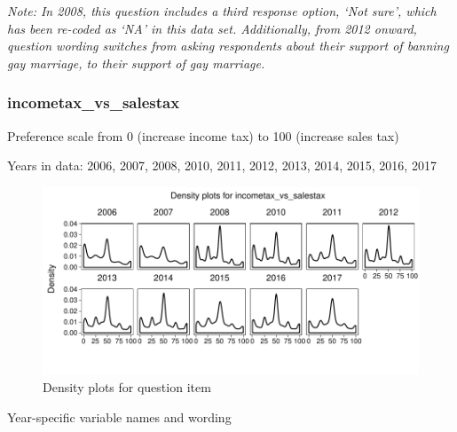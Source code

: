 \documentclass[12pt]{article}
\begin{document}
\emph{Note: In 2008, this question includes a third response option,
`Not sure', which has been re-coded as `NA' in this data set.
Additionally, from 2012 onward, question wording switches from asking
respondents about their support of banning gay marriage, to their
support of gay marriage.}

\subsubsection{incometax\_vs\_salestax}\label{incometax_vs_salestax}

Preference scale from 0 (increase income tax) to 100 (increase sales
tax)

Years in data: 2006, 2007, 2008, 2010, 2011, 2012, 2013, 2014, 2015,
2016, 2017

\begin{figure}

{\centering \includegraphics{guide_cumulative_cces_policy_preferences_files/figure-latex/unnamed-chunk-4-2} 

}

\caption{Density plots for question item}\label{fig:unnamed-chunk-4-2}
\end{figure}

Year-specific variable names and wording
\end{document}
